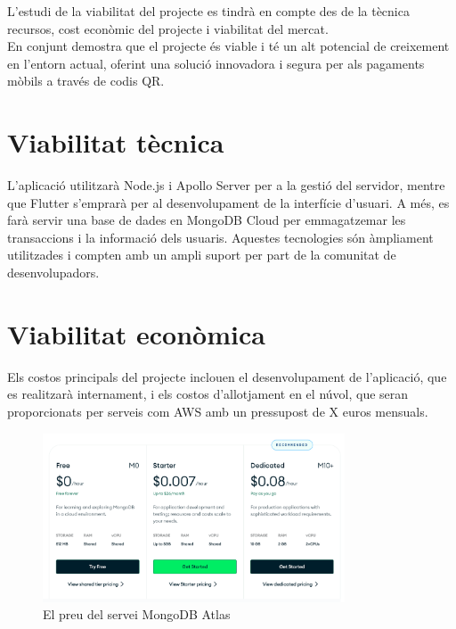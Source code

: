 \documentclass[a4paper,12pt,twoside]{ThesisStyle}
\begin{document}
L'estudi de la viabilitat del projecte es tindrà en compte des de la tècnica
recursos, cost econòmic del projecte i viabilitat del mercat.\\

En conjunt demostra que el projecte és viable i té un alt potencial de creixement en l'entorn actual, oferint una solució innovadora i segura per als pagaments mòbils a través de codis QR.

\section{Viabilitat tècnica}
\label{subsec:Viabilitat tècnica}

L’aplicació utilitzarà Node.js i Apollo Server per a la gestió del servidor, mentre que Flutter s’emprarà per al desenvolupament de la interfície d’usuari. A més, es farà servir una base de dades en MongoDB Cloud per emmagatzemar les transaccions i la informació dels usuaris. Aquestes tecnologies són àmpliament utilitzades i compten amb un ampli suport per part de la comunitat de desenvolupadors.

\section{Viabilitat econòmica}
\label{subsec:Viabilitat económica}

Els costos principals del projecte inclouen el desenvolupament de l'aplicació, que es realitzarà internament, i els costos d'allotjament en el núvol, que seran proporcionats per serveis com AWS amb un pressupost de X euros mensuals.\\

\begin{figure}[h!] %
    \centering
    \includegraphics[width=0.8\textwidth]{imatges/mongodb.png} %
    \caption{El preu del servei MongoDB Atlas} %
    \label{fig:El preu del servei MongoDB Atlas} %
  \end{figure}
\end{document}
